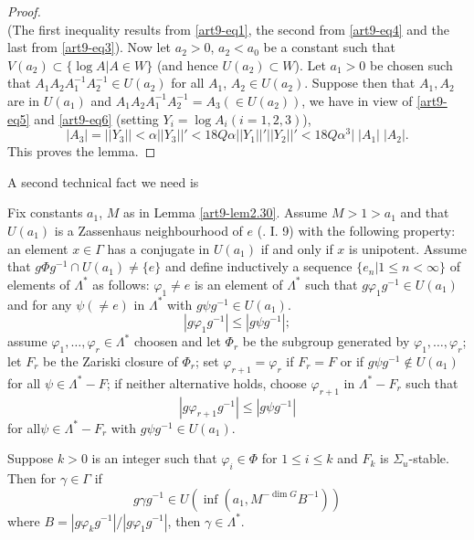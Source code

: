 \begin{proof}
\begin{equation}
\end{equation}
(The first inequality results from \ref{art9-eq1}, the second from \ref{art9-eq4} and the last from \ref{art9-eq3}). Now let $a_2 > 0$, $a_2 < a_0$ be a constant such that $V(a_2) \subset \{\log A | A \in W\}$ (and hence $U (a_2) \subset W$). Let $a_1 > 0$ be chosen such that $A_1 A_2 A^{-1}_1 A^{-1}_2 \in U (a_2)$  for all $A_1$, $A_2 \in U (a_2)$. Suppose then that $A_1, A_2$ are in $U (a_1)$ and $A_1 A_2 A_1^{-1} A^{-1}_2 = A_3 (\in U (a_2))$, we have in view of \ref{art9-eq5} and \ref{art9-eq6} (setting $Y_i = \log A_i (i = 1, 2, 3)$),
\begin{equation}
|A_3| = ||Y_3|| < \alpha ||Y_3||' < 18 Q \alpha ||Y_1||' ||Y_2 ||' < 18 Q \alpha^3\big| \; |A_1|\; |A_2|. \label{art9-eq7}
\end{equation}
This proves the lemma.
\end{proof}

A second technical fact we need is

\begin{lemma}\label{art9-lem2.31}
Fix constants $a_1$, $M$ as in Lemma \ref{art9-lem2.30}. Assume $M> 1> a_1$ and that $U(a_1)$ is a Zassenhaus neighbourhood of $e$ (\cf. I. 9) with the following property: an element $x \in \Gamma$ has a conjugate in $U (a_1)$ if and only if $x$ is unipotent. Assume that $g\Phi g^{-1} \cap U (a_1) \neq \{e\}$ and define inductively a sequence $\{e_n\big| 1 \leqslant n < \infty\}$ of elements of $\Lambda^\ast$ as follows: $\varphi_1 \neq e$ is an element of $\Lambda^\ast$ such that $g \varphi_1 g^{-1} \in U (a_1)$ and for any $\psi (\neq e)$ in $\Lambda^\ast$ with $g \psi g^{-1} \in U (a_1)$.
$$
|g \varphi_1 g^{-1}| \leqslant |g \psi g^{-1}|;
$$
assume $\varphi_1, \ldots, \varphi_r \in \Lambda^\ast$ choosen and let $\Phi_r$ be the subgroup generated by $\varphi_1, \ldots, \varphi_r$; let $F_r$ be the Zariski closure of $\Phi_r$; set $\varphi_{r+1} = \varphi_r$ if $F_r = F$ or if $g \psi g^{-1} \not\in U (a_1)$ for all $\psi \in \Lambda^{\ast}- F$; if neither alternative holds, choose $\varphi_{r+1}$ in $\Lambda^\ast-F_r$ such that 
$$
|g \varphi_{r+1} g^{-1}| \leqslant |g\psi g^{-1}|
$$
for all\pageoriginale $\psi \in \Lambda^\ast - F_r$ with $g \psi g^{-1} \in U (a_1)$.

Suppose $k >0$ is an integer such that $\varphi_i \in \Phi$ for $1 \leqslant i \leqslant k$ and $F_k$ is $\Sigma_u$-stable. Then for $\gamma \in \Gamma$ if
$$
g \gamma g^{-1} \in U (\inf (a_1, M^{-\dim G} B^{-1}))
$$
where $B =  |g \varphi_k g^{-1}| / |g \varphi_1 g^{-1}|$, then $\gamma \in \Lambda^\ast$.
\end{lemma}

